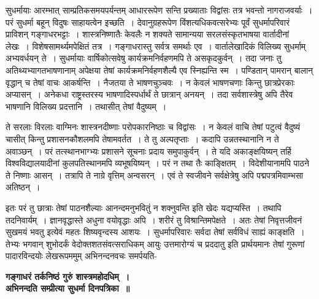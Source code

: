 {सुधर्मायाः आरम्भात् साम्प्रतिकसमयपर्यन्तम् आधाररूपेण सन्ति प्रख्याताः विद्वांसः तत्र भवन्तो नागराजवर्याः~। परं सुधर्मा बहून् विदुषः साहायत्वेन इच्छति~। देवानुग्रहरूपेण विंशत्यधिकवत्सरेभ्यः पूर्वं सुधर्मापरिवारं प्राविशन् गङ्गाधरभट्टाः~। शास्त्रनिष्णातैः केवलैः न शक्यते सामान्यया सरलसंस्कृतभाषया वार्तादीनां लेखः~। विशेषसामर्थ्यमपेक्षितं तत्र~। गङ्गाधरास्तु सर्वत्र समर्थाः एव~। वार्तालेखादिकं विलिख्य सुधर्माम् अभ्यवर्धयन् ते~। सुधर्मायाः वार्षिकोत्सवेषु कार्यक्रमनिर्वहणमपि ते असकृदकुर्वन्~। तदा जनाः तु अतिथ्यभ्यागतभाषणानाम् अपेक्षया तेषां कार्यक्रमनिर्वहणशैल्यै एव स्निह्यन्ति स्म~। पण्डितान् पामरान् बालान् वृद्धान् च तेषां वाचः आकर्षन्ति~। नैजतया ते भाषणचुञ्चवः~। न केवलं भाषणचणाः किन्तु छात्रप्रेरकाः अप्यासन्~। अनेकधा राष्ट्रस्तरस्य भाषणादिस्पर्धार्थं ते छात्रान् अनयन्~। तदा सर्वशास्त्रेषु अपि तैरेव भाषणानि विलिख्य प्रदत्तानि~। तथासीत् तेषां वैदुष्यम्~। 

ते सरलाः विरलाः वाग्मिनः शास्त्रनदीष्णाः परोपकारनिष्ठाः च विद्वांसः~। न केवलं वाचि तेषां पटुत्वं वैदुष्यं चासीत् किन्तु प्रशासनकौशलमपि तेषामवर्तत~। ते तु अल्पतृप्ताः~। कदापि उन्नतस्थानानि न ते अवाञ्छन्~। परं तत्स्थानभाग्भ्यः प्रशासने सूचनाः प्रदाय समुपाकुर्वन्~। ते यदि अकाङ्क्षयिष्यन् तर्हि विश्वविद्यालयादीनां कुलपतिस्थानमपि व्यभूषयिष्यन्~। परं न तथा तैः काङ्क्षितम्~। विदेशीयानामपि पाठने ते निष्णाः आसन्~। तत्रापि ते नाग्रे वृत्तिम् अन्वसरन्~। एवं ते स्वजीवने सर्वक्षेत्रेषु अपि पद्मपत्रमिवाम्भसा अतिष्ठन्~। 

इतः परं तु छात्राः तेषां पाठनशैल्याः आनन्दमनुभवितुं न शक्नुवन्ति इति खेदः यद्यप्यस्ति~। तथापि तदनिवार्यम्~। ज्ञानवृद्धास्ते अधुना वयोवृद्धाः अपि~। शरीरं तु विश्रान्तिमपेक्षते~। अतः तेषां निवृत्तजीवनं सुखमयं भवतु इत्येवं महतः शिष्यवृन्दस्य आशयः~। सुधर्मापरिवारः सर्वदा तेषां सर्वविधं साह्यं काङ्क्षति~। तेभ्यः भगवान् शुभोदर्कं वेदोक्तशतसंवत्सराधिकम् आयुः उत्तमारोग्यं च प्रददातु इति प्रार्थयमानः तेषां गुरूणां पादारविन्दयोः लेखरूपममुम् अभिनन्दनवचः समर्पयति-

\begin{center}
\textbf{गङ्गाधरं तर्कनिष्ठं गुरुं शास्त्रमहोदधिम्~।\\
अभिनन्दति सम्प्रीत्या सुधर्मा दिनपत्रिका~॥}
\end{center}

\articleend

}
